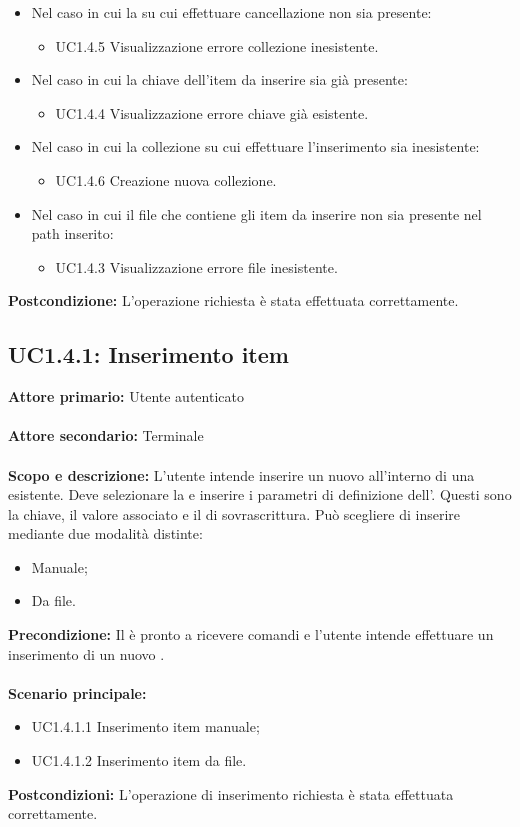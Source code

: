 \documentclass{scalatekids-article}
\begin{document}
\begin{itemize}
  \item Nel caso in cui la  su cui effettuare cancellazione non sia presente:
  \begin{itemize}
    \item UC1.4.5 Visualizzazione errore collezione inesistente.
  \end{itemize}
  \item Nel caso in cui la chiave dell'item da inserire sia già presente:
  \begin{itemize}
    \item UC1.4.4 Visualizzazione errore chiave già esistente.
  \end{itemize}
  \item Nel caso in cui la collezione su cui effettuare l'inserimento sia inesistente:
  \begin{itemize}
    \item UC1.4.6 Creazione nuova collezione.
  \end{itemize}
  \item Nel caso in cui il file che contiene gli item da inserire non sia presente nel path inserito:
  \begin{itemize}
    \item UC1.4.3 Visualizzazione errore file inesistente.
  \end{itemize}
\end{itemize}
\textbf{Postcondizione:} L'operazione richiesta è stata effettuata correttamente.

\subsection{UC1.4.1: Inserimento item}

\textbf{Attore primario:} Utente autenticato\\ \\
\textbf{Attore secondario:} Terminale\\ \\
\textbf{Scopo e descrizione:} L'utente intende inserire un nuovo  all'interno di una  esistente. Deve selezionare la  e inserire i parametri di definizione dell'. Questi sono la chiave, il valore associato e il  di sovrascrittura. Può scegliere di inserire mediante due modalità distinte:
\begin{itemize}
  \item Manuale;
  \item Da file.
\end{itemize}
\textbf{Precondizione:} Il  è pronto a ricevere comandi e l'utente intende effettuare un inserimento di un nuovo .\\ \\
\textbf{Scenario principale:}
\begin{itemize}
  \item UC1.4.1.1 Inserimento item manuale;
  \item UC1.4.1.2 Inserimento item da file.
\end{itemize}
\textbf{Postcondizioni:} L'operazione di inserimento richiesta è stata effettuata correttamente.
\end{document}
